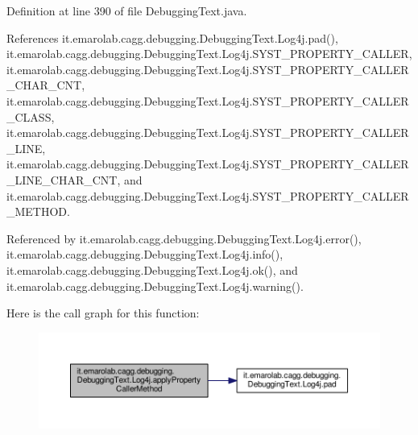 Definition at line 390 of file Debugging\-Text.\-java.



References it.\-emarolab.\-cagg.\-debugging.\-Debugging\-Text.\-Log4j.\-pad(), it.\-emarolab.\-cagg.\-debugging.\-Debugging\-Text.\-Log4j.\-S\-Y\-S\-T\-\_\-\-P\-R\-O\-P\-E\-R\-T\-Y\-\_\-\-C\-A\-L\-L\-E\-R, it.\-emarolab.\-cagg.\-debugging.\-Debugging\-Text.\-Log4j.\-S\-Y\-S\-T\-\_\-\-P\-R\-O\-P\-E\-R\-T\-Y\-\_\-\-C\-A\-L\-L\-E\-R\-\_\-\-C\-H\-A\-R\-\_\-\-C\-N\-T, it.\-emarolab.\-cagg.\-debugging.\-Debugging\-Text.\-Log4j.\-S\-Y\-S\-T\-\_\-\-P\-R\-O\-P\-E\-R\-T\-Y\-\_\-\-C\-A\-L\-L\-E\-R\-\_\-\-C\-L\-A\-S\-S, it.\-emarolab.\-cagg.\-debugging.\-Debugging\-Text.\-Log4j.\-S\-Y\-S\-T\-\_\-\-P\-R\-O\-P\-E\-R\-T\-Y\-\_\-\-C\-A\-L\-L\-E\-R\-\_\-\-L\-I\-N\-E, it.\-emarolab.\-cagg.\-debugging.\-Debugging\-Text.\-Log4j.\-S\-Y\-S\-T\-\_\-\-P\-R\-O\-P\-E\-R\-T\-Y\-\_\-\-C\-A\-L\-L\-E\-R\-\_\-\-L\-I\-N\-E\-\_\-\-C\-H\-A\-R\-\_\-\-C\-N\-T, and it.\-emarolab.\-cagg.\-debugging.\-Debugging\-Text.\-Log4j.\-S\-Y\-S\-T\-\_\-\-P\-R\-O\-P\-E\-R\-T\-Y\-\_\-\-C\-A\-L\-L\-E\-R\-\_\-\-M\-E\-T\-H\-O\-D.



Referenced by it.\-emarolab.\-cagg.\-debugging.\-Debugging\-Text.\-Log4j.\-error(), it.\-emarolab.\-cagg.\-debugging.\-Debugging\-Text.\-Log4j.\-info(), it.\-emarolab.\-cagg.\-debugging.\-Debugging\-Text.\-Log4j.\-ok(), and it.\-emarolab.\-cagg.\-debugging.\-Debugging\-Text.\-Log4j.\-warning().



Here is the call graph for this function\-:\nopagebreak
\begin{figure}[H]
\begin{center}
\leavevmode
\includegraphics[width=350pt]{classit_1_1emarolab_1_1cagg_1_1debugging_1_1DebuggingText_1_1Log4j_a2401d6c8ef1312e54a3483d09b24baf4_cgraph}
\end{center}
\end{figure}


